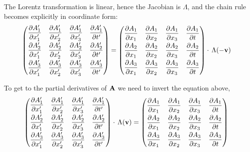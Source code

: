 \documentclass[12pt]{article}
\newcommand{\ds}{\displaystyle}
\begin{document}
The Lorentz transformation is linear, hence the Jacobian is $\Lambda$, and the chain rule
becomes explicitly in coordinate form:
\begin{equation}
  \begin{pmatrix}
    \ds\pdv{A'_1}{x'_1} & \ds\pdv{A'_1}{x'_2} & \ds\pdv{A'_1}{x'_3} & \ds\pdv{A'_1}{t'} \\[8pt]
    \ds\pdv{A'_2}{x'_1} & \ds\pdv{A'_2}{x'_2} & \ds\pdv{A'_2}{x'_3} & \ds\pdv{A'_2}{t'} \\[8pt]
    \ds\pdv{A'_3}{x'_1} & \ds\pdv{A'_3}{x'_2} & \ds\pdv{A'_3}{x'_3} & \ds\pdv{A'_3}{t'}
  \end{pmatrix}
  =
  \begin{pmatrix}
    \ds\pdv{A_1}{x_1} & \ds\pdv{A_1}{x_2} & \ds\pdv{A_1}{x_3} & \ds\pdv{A_1}{t} \\[8pt]
    \ds\pdv{A_2}{x_1} & \ds\pdv{A_2}{x_2} & \ds\pdv{A_2}{x_3} & \ds\pdv{A_2}{t} \\[8pt]
    \ds\pdv{A_3}{x_1} & \ds\pdv{A_3}{x_2} & \ds\pdv{A_3}{x_3} & \ds\pdv{A_3}{t}
  \end{pmatrix}
  \cdot\, \Lambda(-\vb{v})
\end{equation}

To get to the partial derivatives of $\vb{A}$ we need to invert the equation above,
\begin{equation}
  \begin{pmatrix}
    \ds\pdv{A'_1}{x'_1} & \ds\pdv{A'_1}{x'_2} & \ds\pdv{A'_1}{x'_3} & \ds\pdv{A'_1}{t'} \\[8pt]
    \ds\pdv{A'_2}{x'_1} & \ds\pdv{A'_2}{x'_2} & \ds\pdv{A'_2}{x'_3} & \ds\pdv{A'_2}{t'} \\[8pt]
    \ds\pdv{A'_3}{x'_1} & \ds\pdv{A'_3}{x'_2} & \ds\pdv{A'_3}{x'_3} & \ds\pdv{A'_3}{t'}
  \end{pmatrix}
  \cdot\,\Lambda(\vb{v})
  =
  \begin{pmatrix}
    \ds\pdv{A_1}{x_1} & \ds\pdv{A_1}{x_2} & \ds\pdv{A_1}{x_3} & \ds\pdv{A_1}{t} \\[8pt]
    \ds\pdv{A_2}{x_1} & \ds\pdv{A_2}{x_2} & \ds\pdv{A_2}{x_3} & \ds\pdv{A_2}{t} \\[8pt]
    \ds\pdv{A_3}{x_1} & \ds\pdv{A_3}{x_2} & \ds\pdv{A_3}{x_3} & \ds\pdv{A_3}{t}
  \end{pmatrix}
\end{equation}
\end{document}
